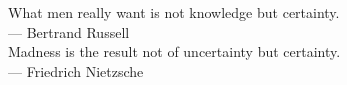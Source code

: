 \thispagestyle{empty}
{}

\vspace*{3cm}

\begin{center}
    What men really want is not knowledge but certainty. \\ \medskip
    --- Bertrand Russell \\   
    \bigskip
    Madness is the result not of uncertainty but certainty. \\ \medskip
    --- Friedrich Nietzsche
\end{center}